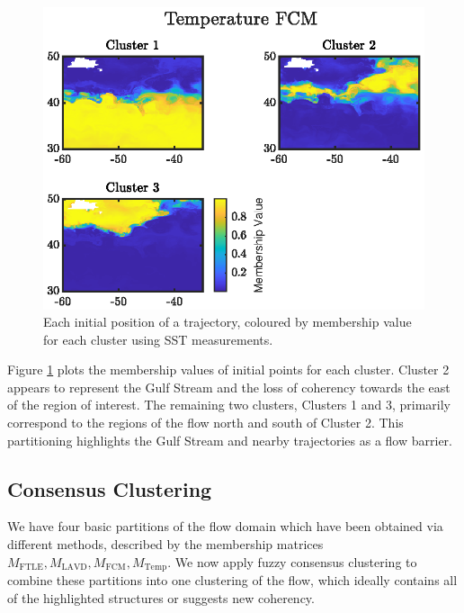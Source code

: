 \documentclass[a4paper, fontsize=12pt]{article}
\begin{document}
\begin{figure}
\begin{center}
	\includegraphics[scale = 1.5]{../figures/atlantic_member_sst.eps}
	\caption{Each initial position of a trajectory, coloured by membership value for each cluster using SST measurements.}
	\label{fig:atlantic_sst_member}
\end{center}
\end{figure}

Figure \ref{fig:atlantic_sst_member} plots the membership values of initial points for each cluster. Cluster 2 appears to represent the Gulf Stream and the loss of coherency towards the east of the region of interest. The remaining two clusters, Clusters 1 and 3, primarily correspond to the regions of the flow north and south of Cluster 2. This partitioning highlights the Gulf Stream and nearby trajectories as a flow barrier. 





\subsection{Consensus Clustering}
We have four basic partitions of the flow domain which have been obtained via different methods, described by the membership matrices \(M_{\text{FTLE}}, M_{\text{LAVD}}, M_{\text{FCM}}, M_{\text{Temp}}\). We now apply fuzzy consensus clustering to combine these partitions into one clustering of the flow, which ideally contains all of the highlighted structures or suggests new coherency.
\end{document}
